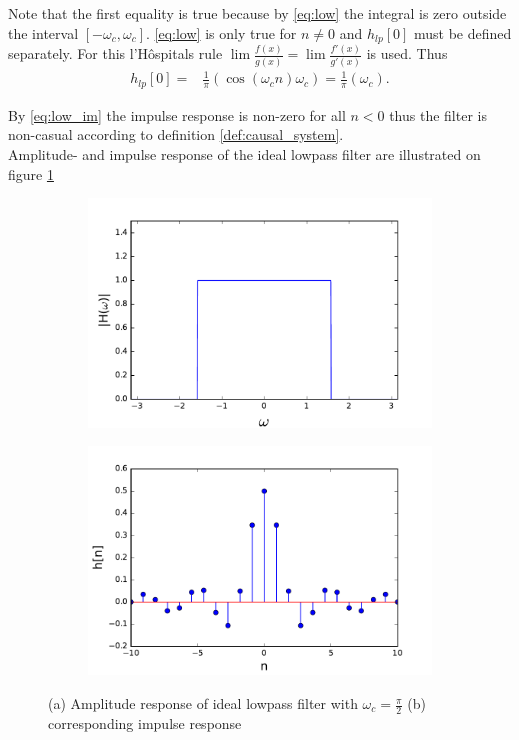 Note that the first equality is true because by \eqref{eq:low} the integral is zero outside the interval $[-\omega_c, \omega_c]$. \eqref{eq:low} is only true for $n \neq 0$ and $h_{lp}[0]$ must be defined separately. For this l'Hôspitals rule $\lim \frac{f(x)}{g(x)}=\lim \frac{f'(x)}{g'(x)}$ is used. Thus
\begin{align}
h_{lp}[0]=& \frac{1}{\pi} \left( \cos\left( \omega_{c} n \right)\omega_{c}\right)
= \frac{1}{\pi}\left( \omega_{c} \right).
\end{align}

By \eqref{eq:low_im} the impulse response is non-zero for all $n<0$ thus the filter is non-casual according to definition \ref{def:causal_system}.\\
Amplitude- and impulse response of the ideal lowpass filter are illustrated on figure \ref{fig:ideal_low}
\begin{figure}[H]
\begin{subfigure}[b]{0.50\textwidth}
        \centering
\includegraphics[scale=0.45]{figures/filter_teori/ideal_low2.pdf}
\caption{}
\end{subfigure}
\begin{subfigure}[b]{0.50\textwidth}
        \centering  
\includegraphics[scale=0.45]{figures/filter_teori/ideal_low1.pdf}
\caption{}
 \end{subfigure}
\caption{ (a) Amplitude response of ideal lowpass filter with $\omega_c = \frac{\pi}{2}$ (b) corresponding impulse response}
\label{fig:ideal_low}
\end{figure}


